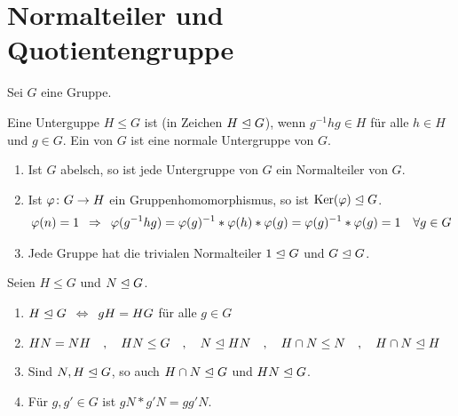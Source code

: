 \section{Normalteiler und Quotientengruppe}
%
Sei $G$ eine Gruppe.
%
\begin{defin}
	Eine Unterguppe $H \leq G$ ist  (in Zeichen $H \trianglelefteq G$), wenn $g^{-1} h g \in H$ für alle $h \in H$ und $g \in G$. Ein  von $G$ ist eine normale Untergruppe von $G$.
\end{defin}
%
\begin{bsp}
	\begin{enumerate}
		\item Ist $G$ abelsch, so ist jede Untergruppe von $G$ ein Normalteiler von $G$.
		\item Ist $\varphi \colon G \to H$ ein Gruppenhomomorphismus, so ist $\operatorname{Ker}(\varphi) \trianglelefteq G$. 
		\begin{align*}
			\varphi(n)=1 \enspace \Rightarrow \enspace \varphi(g^{-1} h g) = \varphi(g)^{-1} * \varphi(h) * \varphi(g) = \varphi(g)^{-1} * \varphi(g) = 1 \quad \forall g \in G
		\end{align*}
		\item Jede Gruppe hat die trivialen Normalteiler $1 \trianglelefteq G$ und $G \trianglelefteq G$.
	\end{enumerate}
\end{bsp}
%
\begin{lemma}
	Seien $H \leq G$ und $N \trianglelefteq G$.
	\begin{enumerate}
		\item $H \trianglelefteq G \enspace \Leftrightarrow \enspace gH = HG$ für alle $g \in G$
		\item $HN = NH \quad , \quad HN \leq G \quad , \quad N \trianglelefteq HN \quad , \quad H \cap N \leq N \quad , \quad H \cap N \trianglelefteq H$
		\item Sind $N,H \trianglelefteq G$, so auch $H \cap N \trianglelefteq G$ und $HN \trianglelefteq G$.
		\item Für $g,g' \in G$ ist $gN * g'N = gg'N$.
	\end{enumerate}
\end{lemma}
